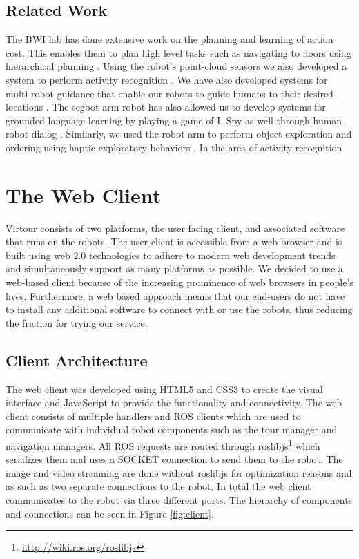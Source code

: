 \documentclass[
  oneside,
  11pt, a4paper,
  footinclude=true,
  headinclude=true,
  cleardoublepage=empty
]{article}
\begin{document}
\subsection{Related Work}

The BWI lab has done extensive work on the planning and learning of action
cost. This enables them to plan high level tasks such as navigating to floors
using hierarchical planning \citep{yang2014, khandelwal2014}. Using the robot's
point-cloud sensors we also developed a system to perform activity recognition
\citep{gori2015robot}. We have also developed systems for multi-robot guidance
that enable our robots to guide humans to their desired locations
\citep{khandelwal2015, khandelwal2014multi}. The segbot arm robot has also
allowed us to develop systems for grounded language learning by playing a game
of I, Spy \citep{thomason2016} as well through human-robot dialog
\citep{thomason2015learning}. Similarly, we used the robot arm to perform
object exploration and ordering using haptic exploratory behaviors
\citep{sinapov2016}. In the area of activity recognition

\section{The Web Client}\label{sec:client}

Virtour consists of two platforms, the user facing client, and associated
software that runs on the robots. The user client is accessible from a web
browser and is built using web 2.0 technologies to adhere to modern web
development trends and simultaneously support as many platforms as possible. We
decided to use a web-based client because of the increasing prominence of web
browsers in people's lives. Furthermore, a web based approach means that our
end-users do not have to install any additional software to connect with or use
the robots, thus reducing the friction for trying our service.

\subsection{Client Architecture}

The web client was developed using HTML5 and CSS3 to create the visual
interface and JavaScript to provide the functionality and connectivity. The
web client consists of multiple handlers and ROS clients which are used to
communicate with individual robot components such as the tour manager and
navigation managers. All ROS requests are routed through
roslibjs\footnote{\url{http://wiki.ros.org/roslibjs}} which serializes them and
uses a SOCKET connection to send them to the robot. The image and video
streaming are done without roslibjs for optimization reasons and as such as two
separate connections to the robot. In total the web client communicates to the
robot via three different ports. The hierarchy of components and connections
can be seen in Figure \ref{fig:client}. 
\end{document}
